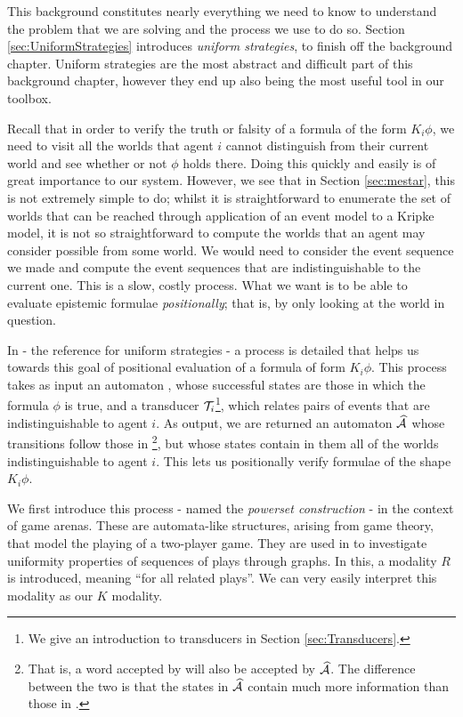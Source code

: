 \documentclass[ %
                    author={Leo Poulson},
                supervisor={Dr. Steven Ramsay},
                    degree={BSc},
                     title={Epistemic Planning for the Dynamic Gossip problem},
                  subtitle={},
                      year={2019} ]{dissertation}
\begin{document}
This background constitutes nearly everything we need to know to understand the
problem that we are solving and the process we use to do so. Section
\ref{sec:UniformStrategies} introduces \emph{uniform strategies}, to finish off
the background chapter. Uniform strategies are the most abstract and difficult part of
this background chapter, however they end up also being the most useful tool in
our toolbox. 

Recall that in order to verify the truth or falsity of a formula of the form
$K_i \phi$, we need to visit all the worlds that agent $i$ cannot distinguish
from their current world and see whether or not $\phi$ holds there. Doing this
quickly and easily is of great importance to our system. However, we see that in
Section \ref{sec:mestar}, this is not extremely simple to do; whilst it is
straightforward to enumerate the set of worlds that can be reached through
application of an event model to a Kripke model, it is not so straightforward to
compute the worlds that an agent may consider possible from some world. We
would need to consider the event sequence we made and compute the event sequences
that are indistinguishable to the current one. This is a slow, costly process.
What we want is to be able to evaluate epistemic formulae \emph{positionally};
that is, by only looking at the world in question.

In \cite{UniformStrategies} - the reference for uniform strategies - a process
is detailed that helps us towards this goal of positional evaluation of a
formula of form $K_i \phi$. This process takes as input an automaton ,
whose successful states are those in which the formula $\phi$ is true, and a
transducer $\mathcal{T}_i$\footnote{We give an introduction to transducers in Section
  \ref{sec:Transducers}.}, which relates pairs of events that are
indistinguishable to agent $i$. As output, we are returned an automaton
$\widehat{\mathcal{A}}$ whose transitions follow those in \footnote{That is,
  a word accepted by  will also be accepted by $\widehat{\mathcal{A}}$. The
  difference between the two is that the states in $\widehat{\mathcal{A}}$ contain
  much more information than those in .}, but whose states
contain in them all of the worlds indistinguishable to agent $i$. This lets us
positionally verify formulae of the shape $K_i \phi$.

We first introduce this process - named the \emph{powerset construction} - in
the context of game arenas. These are automata-like structures, arising from
game theory, that model the playing of a two-player game. They are used in
\cite{UniformStrategies} to investigate uniformity properties of sequences of
plays through graphs. In this, a modality $R$ is introduced, meaning ``for all
related plays''. We can very easily interpret this modality as our $K$ modality. 
\end{document}
